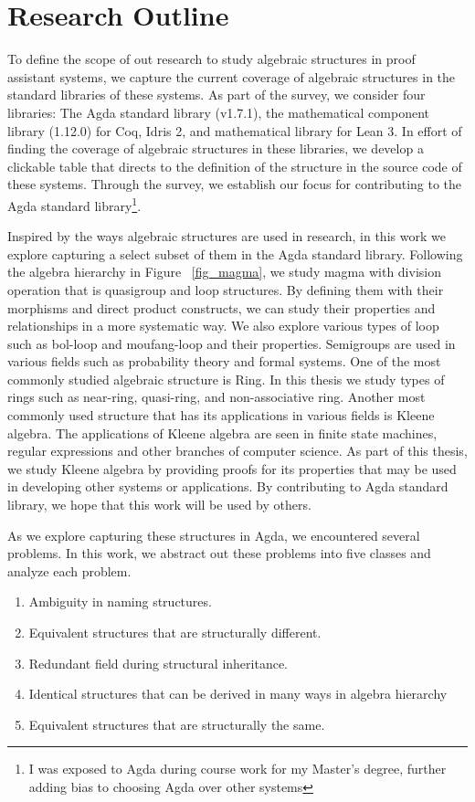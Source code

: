 \section{Research Outline}
To define the scope of out research to study algebraic structures in proof
assistant systems, we capture the current coverage of algebraic structures in
the standard libraries of these systems. As part of the survey, we consider four
libraries: The Agda standard library (v1.7.1), the mathematical component
library (1.12.0) for Coq, Idris 2, and mathematical library for Lean 3. In
effort of finding the coverage of algebraic structures in these libraries, we
develop a clickable table that directs to the definition of the structure in the
source code of these systems. Through the survey, we establish our focus for
contributing to the Agda standard library\footnote{I was exposed to Agda during
course work for my Master's degree, further adding bias to choosing Agda over
other systems}.

Inspired by the ways algebraic structures are used in research, in this work we
explore capturing a select subset of them in the Agda standard library. Following
the algebra hierarchy in Figure ~\ref{fig_magma}, we study magma with division
operation that is quasigroup and loop structures. By defining them with their
morphisms and direct product constructs, we can study their properties and
relationships in a more systematic way. We also explore various types of loop
such as bol-loop and moufang-loop and their properties. Semigroups are used in
various fields such as probability theory and formal systems. One of the most
commonly studied algebraic structure is Ring. In this thesis we study types of
rings such as near-ring, quasi-ring, and non-associative ring. Another most
commonly used structure that has its applications in various fields is Kleene
algebra. The applications of Kleene algebra are seen in finite state machines,
regular expressions and other branches of computer science. As part of this
thesis, we study Kleene algebra by providing proofs for its properties that may
be used in developing other systems or applications. By contributing to Agda
standard library, we hope that this work will be used by others. 

As we explore capturing these structures in Agda, we encountered several
problems. In this work, we abstract out these problems into five classes and
analyze each problem. 
\begin{enumerate}
\item Ambiguity in naming structures.
\item Equivalent structures that are structurally different.
\item Redundant field during structural inheritance.
\item Identical structures that can be derived in many ways in algebra hierarchy
\item Equivalent structures that are structurally the same.
\end{enumerate}

